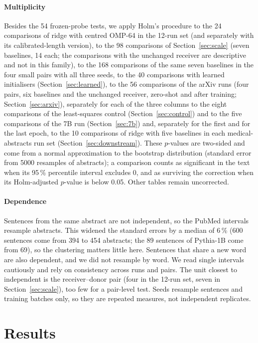 \documentclass[preprint,12pt]{elsarticle}
\begin{document}
\paragraph{Multiplicity} Besides the 54 frozen-probe tests, we apply Holm's procedure to the 24 comparisons of ridge with centred OMP-64 in the 12-run set (and separately with its calibrated-length version), to the 98 comparisons of Section~\ref{sec:scale} (seven baselines, 14 each; the comparisons with the unchanged receiver are descriptive and not in this family), to the 168 comparisons of the same seven baselines in the four small pairs with all three seeds, to the 40 comparisons with learned initialisers (Section~\ref{sec:learned}), to the 56 comparisons of the arXiv runs (four pairs, six baselines and the unchanged receiver, zero-shot and after training; Section~\ref{sec:arxiv}), separately for each of the three columns to the eight comparisons of the least-squares control (Section~\ref{sec:control}) and to the five comparisons of the 7B run (Section~\ref{sec:7b}) and, separately for the first and for the last epoch, to the 10 comparisons of ridge with five baselines in each medical-abstracts run set (Section~\ref{sec:downstream}). These $p$-values are two-sided and come from a normal approximation to the bootstrap distribution (standard error from 5000 resamples of abstracts); a comparison counts as significant in the text when its 95\,\% percentile interval excludes 0, and as surviving the correction when its Holm-adjusted $p$-value is below 0.05. Other tables remain uncorrected.


\paragraph{Dependence} Sentences from the same abstract are not independent, so the PubMed intervals resample abstracts. This widened the standard errors by a median of 6\,\% (600 sentences come from 394 to 454 abstracts; the 89 sentences of Pythia-1B come from 69), so the clustering matters little here. Sentences that share a new word are also dependent, and we did not resample by word. We read single intervals cautiously and rely on consistency across runs and pairs. The unit closest to independent is the receiver--donor pair (four in the 12-run set, seven in Section~\ref{sec:scale}), too few for a pair-level test. Seeds resample sentences and training batches only, so they are repeated measures, not independent replicates.

\section{Results}
\label{sec:results}
\end{document}
